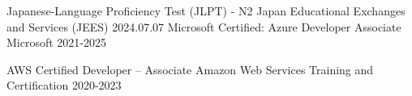 

\begin{cvhonors}
  \cvhonor
    {Japanese-Language Proficiency Test (JLPT) - N2} %
    {Japan Educational Exchanges and Services (JEES)} %
    {} %
    {2024.07.07} %
  \cvhonor
    {Microsoft Certified: Azure Developer Associate} %
    {Microsoft} %
    {} %
    {2021-2025} %

  \cvhonor
    {AWS Certified Developer – Associate} %
    {Amazon Web Services Training and Certification} %
    {} %
    {2020-2023} %

\end{cvhonors}
